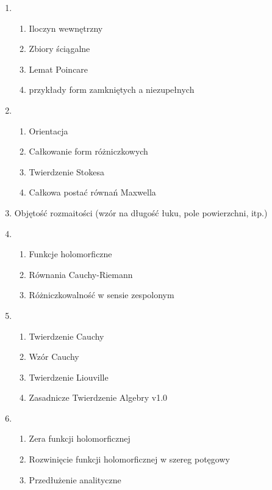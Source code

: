\documentclass[main.tex]{subfiles}
\begin{document}
    \begin{enumerate}
        \item
            \begin{enumerate}
                \item Iloczyn wewnętrzny
                \item Zbiory ściągalne
                \item Lemat Poincare
                \item przykłady form zamkniętych a niezupełnych
            \end{enumerate}
        \item
            \begin{enumerate}
                \item Orientacja
                \item Całkowanie form różniczkowych
                \item Twierdzenie Stokesa
                \item Całkowa postać równań Maxwella
            \end{enumerate}
        \item Objętość rozmaitości (wzór na długość łuku, pole powierzchni, itp.)
        \item
            \begin{enumerate}
                \item Funkcje holomorficzne
                \item Równania Cauchy-Riemann
                \item Różniczkowalność w sensie zespolonym
            \end{enumerate}
        \item
            \begin{enumerate}
                \item Twierdzenie Cauchy
                \item Wzór Cauchy
                \item Twierdzenie Liouville
                \item Zasadnicze Twierdzenie Algebry v1.0
            \end{enumerate}
        \item
            \begin{enumerate}
                \item Zera funkcji holomorficznej
                \item Rozwinięcie funkcji holomorficznej w szereg potęgowy
                \item Przedłużenie analityczne

\end{enumerate}
\end{enumerate}
\end{document}
